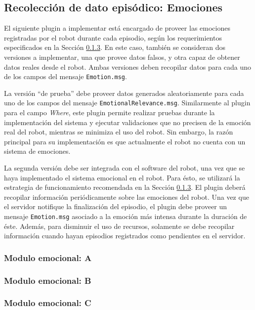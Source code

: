 \subsection{Recolección de dato episódico: Emociones}

El siguiente plugin a implementar está encargado de proveer las emociones registradas por el robot durante cada episodio, según los requerimientos especificados en la Sección \ref{}. En este caso, también se consideran dos versiones a implementar, una que provee datos falsos, y otra capaz de obtener datos reales desde el robot. Ambas versiones deben recopilar datos para cada uno de los campos del mensaje \texttt{Emotion.msg}.

La versión ``de prueba'' debe proveer datos generados aleatoriamente para cada uno de los campos del mensaje \texttt{EmotionalRelevance.msg}. Similarmente al plugin para el campo \textit{Where}, este plugin permite realizar pruebas durante la implementación del sistema y ejecutar validaciones que no precisen de la emoción real del robot, mientras se minimiza el uso del robot. Sin embargo, la razón principal para su implementación es que actualmente el robot no cuenta con un sistema de emociones.

La segunda versión debe ser integrada con el software del robot, una vez que se haya implementado el sistema emocional en el robot. Para ésto, se utilizará la estrategia de funcionamiento recomendada en la Sección \ref{}. El plugin deberá recopilar información periódicamente sobre las emociones del robot. Una vez que el servidor notifique la finalización del episodio, el plugin debe proveer un mensaje \texttt{Emotion.msg} asociado a la emoción más intensa durante la duración de éste. Además, para disminuir el uso de recursos, solamente se debe recopilar información cuando hayan episodios registrados como pendientes en el servidor.

\subsubsection{Modulo emocional: A}
\subsubsection{Modulo emocional: B}
\subsubsection{Modulo emocional: C}
